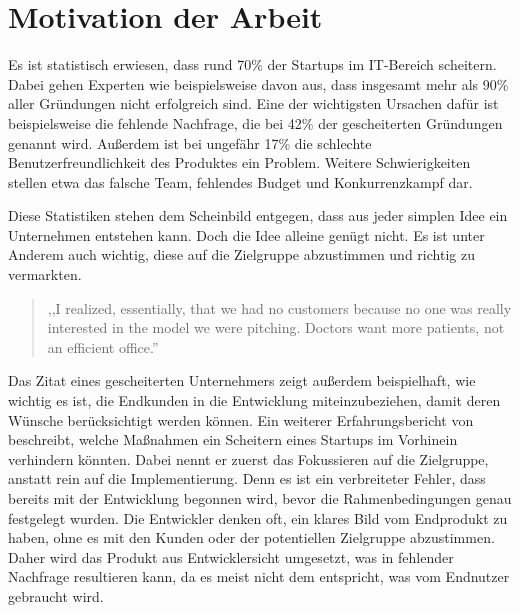 \section{Motivation der Arbeit}
Es ist statistisch erwiesen, dass rund 70\% der Startups im IT-Bereich scheitern.  \cite{CBInsights_failure} Dabei gehen Experten wie beispielsweise  davon aus, dass insgesamt mehr als 90\% aller Gründungen nicht erfolgreich sind. Eine der wichtigsten Ursachen dafür ist beispielsweise die fehlende Nachfrage, die bei 42\% der gescheiterten Gründungen genannt wird. Außerdem ist bei ungefähr 17\% die schlechte Benutzerfreundlichkeit des Produktes ein Problem. Weitere Schwierigkeiten stellen etwa das falsche Team, fehlendes Budget und Konkurrenzkampf dar. \cite{CBInsights_reasons} 

Diese Statistiken stehen dem Scheinbild entgegen, dass aus jeder simplen Idee ein Unternehmen entstehen kann. Doch die Idee alleine genügt nicht. Es ist unter Anderem auch wichtig, diese auf die Zielgruppe abzustimmen und richtig zu vermarkten. 
\begin{quote}
,,I realized, essentially, that we had no customers because no one was really interested in the model we were pitching. Doctors want more patients, not an efficient office.'' \cite{CBInsights_reasons}
\end{quote}
Das Zitat eines gescheiterten Unternehmers zeigt außerdem beispielhaft, wie wichtig es ist, die Endkunden in die Entwicklung miteinzubeziehen, damit deren Wünsche berücksichtigt werden können. Ein weiterer Erfahrungsbericht von  beschreibt, welche Maßnahmen ein Scheitern eines Startups im Vorhinein verhindern könnten. Dabei nennt er zuerst das Fokussieren auf die Zielgruppe, anstatt rein auf die Implementierung. Denn es ist ein verbreiteter Fehler, dass bereits mit der Entwicklung begonnen wird, bevor die Rahmenbedingungen genau festgelegt wurden. Die Entwickler denken oft, ein klares Bild vom Endprodukt zu haben, ohne es mit den Kunden oder der potentiellen Zielgruppe abzustimmen. Daher wird das Produkt aus Entwicklersicht umgesetzt, was in fehlender Nachfrage resultieren kann, da es meist nicht dem entspricht, was vom Endnutzer gebraucht wird.

